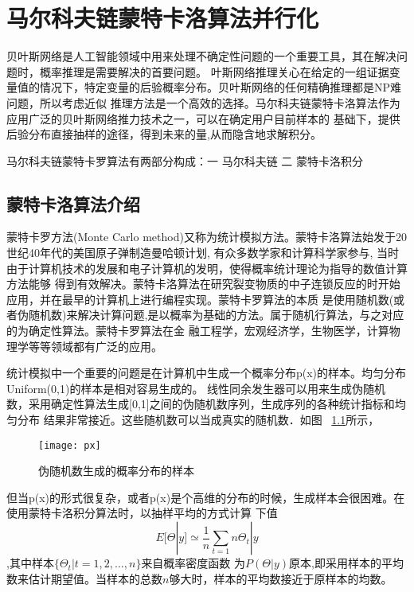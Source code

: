 
\chapter[马尔科夫链蒙特卡洛算法并行化]{马尔科夫链蒙特卡洛算法并行化}
    贝叶斯网络是人工智能领域中用来处理不确定性问题的一个重要工具，其在解决问题时，概率推理是需要解决的首要问题。
叶斯网络推理关心在给定的一组证据变量值的情况下，特定变量的后验概率分布。贝叶斯网络的任何精确推理都是NP难问题，所以考虑近似
推理方法是一个高效的选择。马尔科夫链蒙特卡洛算法作为应用广泛的贝叶斯网络推力技术之一，可以在确定用户目前样本的
基础下，提供后验分布直接抽样的途径，得到未来的量,从而隐含地求解积分。

马尔科夫链蒙特卡罗算法有两部分构成：一 马尔科夫链 二 蒙特卡洛积分 
\section{蒙特卡洛算法介绍}
    蒙特卡罗方法(Monte Carlo method)又称为统计模拟方法。蒙特卡洛算法始发于20世纪40年代的美国原子弹制造曼哈顿计划,
有众多数学家和计算科学家参与, 当时由于计算机技术的发展和电子计算机的发明，使得概率统计理论为指导的数值计算方法能够
得到有效解决。蒙特卡洛算法在研究裂变物质的中子连锁反应的时开始应用，并在最早的计算机上进行编程实现。蒙特卡罗算法的本质
是使用随机数(或者伪随机数)来解决计算问题,是以概率为基础的方法。属于随机行算法，与之对应的为确定性算法。蒙特卡罗算法在金
融工程学，宏观经济学，生物医学，计算物理学等等领域都有广泛的应用。

    统计模拟中一个重要的问题是在计算机中生成一个概率分布p(x)的样本。均匀分布Uniform(0,1)的样本是相对容易生成的。 
线性同余发生器可以用来生成伪随机数，采用确定性算法生成[0,1]之间的伪随机数序列，生成序列的各种统计指标和均匀分布
结果非常接近。这些随机数可以当成真实的随机数．如图 ~\ref{fig:px}所示，

    \begin{figure}[htbp]
    \centering
    \texttt{[image: px]}
    \caption{伪随机数生成的概率分布的样本}\label{fig:px}
    \vspace{\baselineskip}
    \end{figure}

    但当p(x)的形式很复杂，或者p(x)是个高维的分布的时候，生成样本会很困难。在使用蒙特卡洛积分算法时，以抽样平均的方式计算
    下值$$E[\Theta|y] \simeq \frac{1}{n} \sum_{t=1}{n}\Theta_t|y$$,其中样本$\{\Theta_t|t=1,2,\ldots,n\}$来自概率密度函数
为$P(\Theta|y)$原本,即采用样本的平均数来估计期望值。当样本的总数$n$够大时，样本的平均数接近于原样本的均数。
    

